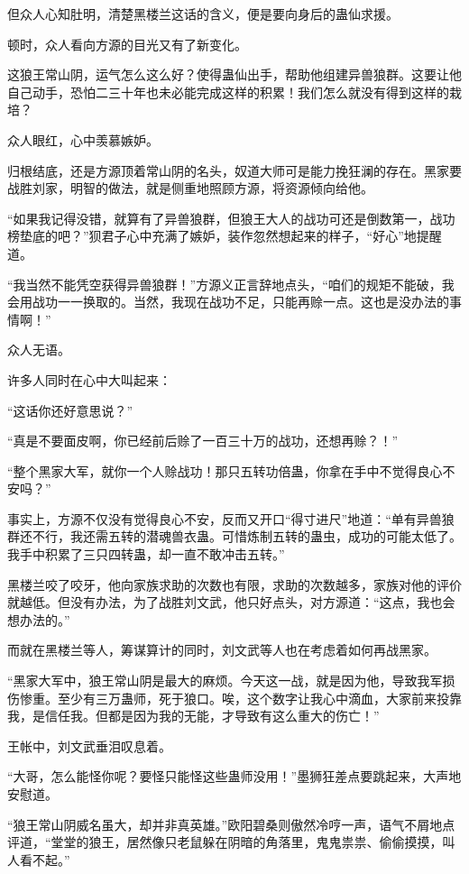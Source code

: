 \begin{this_body}
但众人心知肚明，清楚黑楼兰这话的含义，便是要向身后的蛊仙求援。

顿时，众人看向方源的目光又有了新变化。

这狼王常山阴，运气怎么这么好？使得蛊仙出手，帮助他组建异兽狼群。这要让他自己动手，恐怕二三十年也未必能完成这样的积累！我们怎么就没有得到这样的栽培？

众人眼红，心中羡慕嫉妒。

归根结底，还是方源顶着常山阴的名头，奴道大师可是能力挽狂澜的存在。黑家要战胜刘家，明智的做法，就是侧重地照顾方源，将资源倾向给他。

“如果我记得没错，就算有了异兽狼群，但狼王大人的战功可还是倒数第一，战功榜垫底的吧？”狈君子心中充满了嫉妒，装作忽然想起来的样子，“好心”地提醒道。

“我当然不能凭空获得异兽狼群！”方源义正言辞地点头，“咱们的规矩不能破，我会用战功一一换取的。当然，我现在战功不足，只能再赊一点。这也是没办法的事情啊！”

众人无语。

许多人同时在心中大叫起来：

“这话你还好意思说？”

“真是不要面皮啊，你已经前后赊了一百三十万的战功，还想再赊？！”

“整个黑家大军，就你一个人赊战功！那只五转功倍蛊，你拿在手中不觉得良心不安吗？”

事实上，方源不仅没有觉得良心不安，反而又开口“得寸进尺”地道：“单有异兽狼群还不行，我还需五转的潜魂兽衣蛊。可惜炼制五转的蛊虫，成功的可能太低了。我手中积累了三只四转蛊，却一直不敢冲击五转。”

黑楼兰咬了咬牙，他向家族求助的次数也有限，求助的次数越多，家族对他的评价就越低。但没有办法，为了战胜刘文武，他只好点头，对方源道：“这点，我也会想办法的。”

而就在黑楼兰等人，筹谋算计的同时，刘文武等人也在考虑着如何再战黑家。

“黑家大军中，狼王常山阴是最大的麻烦。今天这一战，就是因为他，导致我军损伤惨重。至少有三万蛊师，死于狼口。唉，这个数字让我心中滴血，大家前来投靠我，是信任我。但都是因为我的无能，才导致有这么重大的伤亡！”

王帐中，刘文武垂泪叹息着。

“大哥，怎么能怪你呢？要怪只能怪这些蛊师没用！”墨狮狂差点要跳起来，大声地安慰道。

“狼王常山阴威名虽大，却并非真英雄。”欧阳碧桑则傲然冷哼一声，语气不屑地点评道，“堂堂的狼王，居然像只老鼠躲在阴暗的角落里，鬼鬼祟祟、偷偷摸摸，叫人看不起。”


\end{this_body}
